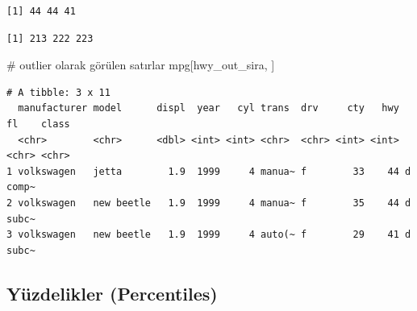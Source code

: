 \documentclass[
  letterpaper,
  DIV=11,
  numbers=noendperiod]{scrreprt}
\newenvironment{Shaded}{\begin{snugshade}}{\end{snugshade}}
\newcommand{\CommentTok}[1]{\textcolor[rgb]{0.37,0.37,0.37}{#1}}
\newcommand{\FunctionTok}[1]{\textcolor[rgb]{0.28,0.35,0.67}{#1}}
\newcommand{\NormalTok}[1]{\textcolor[rgb]{0.00,0.23,0.31}{#1}}
\newcommand{\OtherTok}[1]{\textcolor[rgb]{0.00,0.23,0.31}{#1}}
\newcommand{\SpecialCharTok}[1]{\textcolor[rgb]{0.37,0.37,0.37}{#1}}
\begin{document}
\begin{Shaded}
\end{Shaded}

\begin{verbatim}
[1] 44 44 41
\end{verbatim}

\begin{Shaded}
\end{Shaded}

\begin{verbatim}
[1] 213 222 223
\end{verbatim}

\begin{Shaded}
\begin{Highlighting}[]
\CommentTok{\# outlier olarak görülen satırlar}
\NormalTok{mpg[hwy\_out\_sira, ]}
\end{Highlighting}
\end{Shaded}

\begin{verbatim}
# A tibble: 3 x 11
  manufacturer model      displ  year   cyl trans  drv     cty   hwy fl    class
  <chr>        <chr>      <dbl> <int> <int> <chr>  <chr> <int> <int> <chr> <chr>
1 volkswagen   jetta        1.9  1999     4 manua~ f        33    44 d     comp~
2 volkswagen   new beetle   1.9  1999     4 manua~ f        35    44 d     subc~
3 volkswagen   new beetle   1.9  1999     4 auto(~ f        29    41 d     subc~
\end{verbatim}

\subsection*{Yüzdelikler
(Percentiles)}\label{yuxfczdelikler-percentiles}
\end{document}
